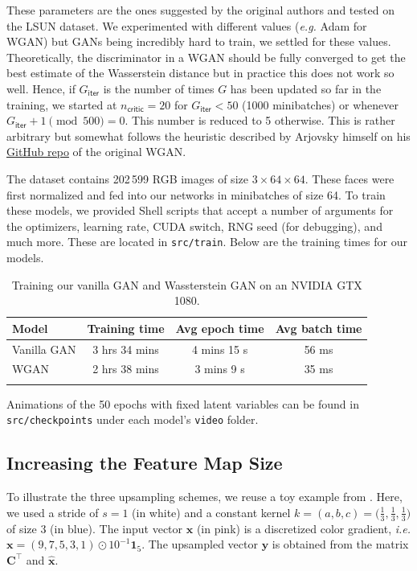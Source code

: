 \documentclass[table]{article}
\def\*#1{\mathbf{#1}}
\newcommand{\code}[1]{{\color{Blue}\small\texttt{#1}}}
\begin{document}
These parameters are the ones suggested by the original authors and tested on the LSUN dataset. We experimented with different values (\textit{e.g.} Adam for WGAN) but GANs being incredibly hard to train, we settled for these values. Theoretically, the discriminator in a WGAN should be fully converged to get the best estimate of the Wasserstein distance but in practice this does not work so well. Hence, if $G_\textsf{iter}$ is the number of times $G$ has been updated so far in the training, we started at $n_\textsf{critic} = 20$ for $G_\textsf{iter} < 50$ (1000 minibatches) or whenever $G_\textsf{iter}+1 \pmod{500} = 0$. This number is reduced to 5 otherwise. This is rather arbitrary but somewhat follows the heuristic described by Arjovsky himself on his \href{https://github.com/martinarjovsky/wassersteingan}{GitHub repo} of the original WGAN.

The dataset contains 202\,599 RGB images of size $3 \times 64 \times 64$. These faces were first normalized and fed into our networks in minibatches of size 64. To train these models, we provided Shell scripts that accept a number of arguments for the optimizers, learning rate, CUDA switch, RNG seed (for debugging), and much more. These are located in \code{src/train}. Below are the training times for our models.

\begin{table}[ht]
\centering
\begin{tabular}{l c c c}
\Xhline{2\arrayrulewidth}
Model & Training time & Avg epoch time & Avg batch time \\
\hline
Vanilla GAN & 3 hrs 34 mins & 4 mins 15 s & 56 ms  \\
WGAN & 2 hrs 38 mins & 3 mins 9 s & 35 ms \\
\Xhline{2\arrayrulewidth}
\end{tabular}
\caption{Training our vanilla GAN and Wassterstein GAN on an NVIDIA GTX 1080.}
\end{table}

Animations of the 50 epochs with fixed latent variables can be found in \code{src/checkpoints} under each model's \code{video} folder.

\subsection{Increasing the Feature Map Size}

To illustrate the three upsampling schemes, we reuse a toy example from \cite{odena2016deconvolution}. Here, we used a stride of $s=1$ (in white) and a constant kernel $k=(a,b,c) = \big(\frac{1}{3}, \frac{1}{3},\frac{1}{3}\big)$ of size 3 (in blue). The input vector $\*x$ (in pink) is a discretized color gradient, \textit{i.e.} $\*x = (9,7,5,3,1) \odot 10^{-1} \*1_5$. The upsampled vector $\*y$ is obtained from the matrix $\*C^\top$ and $\*{\hat x}$.
\end{document}

